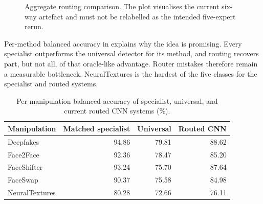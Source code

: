 \begin{figure}[H]
\centering
{}
\caption{Aggregate routing comparison. The plot visualises the current six-way
artefact and must not be relabelled as the intended five-expert rerun.}
\label{fig:routing-bars}
\end{figure}

Per-method balanced accuracy in  explains why the idea
is promising. Every specialist outperforms the universal detector for its method,
and routing recovers part, but not all, of that oracle-like advantage. Router
mistakes therefore remain a measurable bottleneck. NeuralTextures is the hardest
of the five classes for the specialist and routed systems.

\begin{table}[H]
\centering
\setlength{\tabcolsep}{10pt}
\caption{Per-manipulation balanced accuracy of specialist, universal, and current
routed CNN systems (\%).}
\label{tab:routing-method}
\begin{tabular}{@{}lrrr@{}}
\toprule
Manipulation & Matched specialist & Universal & Routed CNN \\
\midrule
Deepfakes & 94.86 & 79.81 & 88.62 \\
Face2Face & 92.36 & 78.47 & 85.20 \\
FaceShifter & 93.24 & 75.70 & 87.64 \\
FaceSwap & 90.37 & 75.58 & 84.98 \\
NeuralTextures & 80.28 & 72.66 & 76.11 \\
\bottomrule
\end{tabular}
\end{table}

